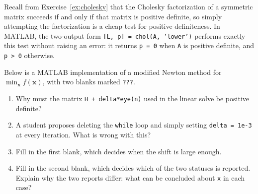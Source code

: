 \begin{exercise} %
    
    Recall from Exercise~\ref{ex:cholesky} that the Cholesky factorization of a symmetric matrix succeeds if and only if that matrix is positive definite, so simply attempting the factorization is a cheap test for positive definiteness. In MATLAB, the two-output form \texttt{[L, p] = chol(A, 'lower')} performs exactly this test without raising an error: it returns \texttt{p = 0} when \texttt{A} is positive definite, and \texttt{p > 0} otherwise.

    Below is a MATLAB implementation of a modified Newton method for $\min_{\mathbf{x}} f(\mathbf{x})$, with two blanks marked \texttt{???}.
    
    \begin{enumerate}[label=(\alph*)]
        \item Why must the matrix \texttt{H + delta*eye(n)} used in the linear solve be positive definite?
        \item A student proposes deleting the \texttt{while} loop and simply setting \texttt{delta = 1e-3} at every iteration. What is wrong with this?
        \item Fill in the first blank, which decides when the shift is large enough.
        \item Fill in the second blank, which decides which of the two statuses is reported. Explain why the two reports differ: what can be concluded about \texttt{x} in each case?
    \end{enumerate}
    
\end{exercise}

